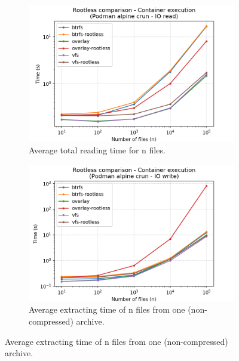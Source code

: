 \begin{figure}[h!]
    \begin{subfigure}{.5\textwidth}
      \centering
      \includegraphics[width=\linewidth]{images/rootless/rootless-execution-Podman-alpine-crun---IO-read.png}
      \caption{Average total reading time for n files.}
      \label{fig:rootless:io-read-exec}
    \end{subfigure}
    \begin{subfigure}{.5\textwidth}
      \centering
      \includegraphics[width=\linewidth]{images/rootless/rootless-execution-Podman-alpine-crun---IO-write.png}
      \caption{Average extracting time of n files from one (non-compressed) archive.}
      \label{fig:rootless:io-write-exec}
    \end{subfigure}
    

\end{figure}

